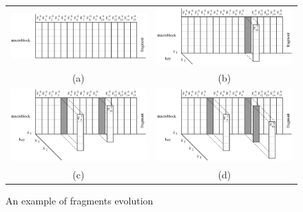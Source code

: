 \begin{figure}[!t]
\setlength{\tabcolsep}{5pt}
\begin{tabular}{cc}
\includegraphics[width=0.48\columnwidth,valign=t]{figures/fig06a}&
\includegraphics[width=0.48\columnwidth,valign=t]{figures/fig06b}\\
{\scriptsize (a)} & {\scriptsize (b)} \\
\includegraphics[width=0.48\columnwidth,valign=t]{figures/fig06c}&
\includegraphics[width=0.48\columnwidth,valign=t]{figures/fig06d}\\
{\scriptsize (c)} & {\scriptsize (d)}\\
\end{tabular}
\caption{\label{ms:fig:pu}An example of fragments evolution}
\end{figure}

